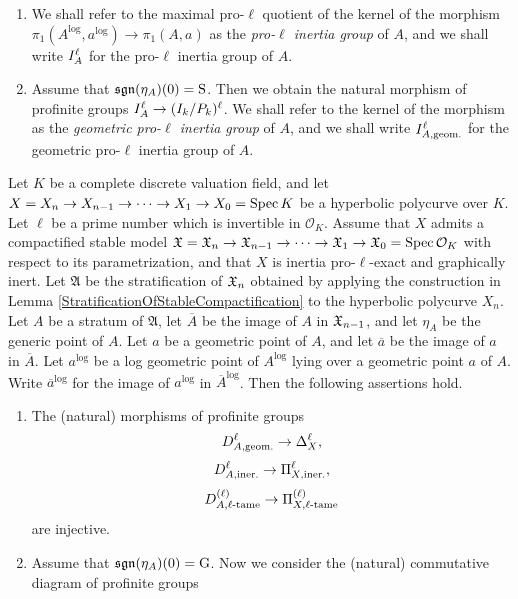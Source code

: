 \begin{defn}
\begin{enumerate}
    \item We shall refer to the maximal pro-$\ell$ quotient of the kernel of the morphism $\pi_1(A^\log, a^\log) \to \pi_1(A, a)$ as the \emph{pro-$\ell$ inertia group} of $A$, and we shall write $I^{\ell}_{A}$ for the pro-$\ell$ inertia group of $A$.
    \item Assume that $\mathfrak{sgn}(\eta_A)(0) = \mathrm{S}$. Then we obtain the natural morphism of profinite groups $I^{\ell}_{A} \to (I_k/P_k)^\ell$. We shall refer to the kernel of the morphism as the \emph{geometric pro-$\ell$ inertia group} of $A$, and we shall write $I^{\ell}_{A, \text{geom.}}$ for the geometric pro-$\ell$ inertia group of $A$.
  \end{enumerate}
\end{defn}

\begin{prop}\label{DecompositionGroupsAndInertiaGroupsAssociatedToStrataCertainExactSequences}
  Let $K$ be a complete discrete valuation field, and let $X = X_n \to X_{n - 1} \to \cdots \to X_1 \to X_0 = \mathrm{Spec} \, K$ be a hyperbolic polycurve over $K$. Let $\ell$ be a prime number which is invertible in $\mathcal{O}_K$. Assume that $X$ admits a compactified stable model $\mathfrak{X} = \mathfrak{X}_n \to \mathfrak{X}_{n - 1} \to \cdots \to \mathfrak{X}_1 \to \mathfrak{X}_0 = \mathrm{Spec} \, \mathcal{O}_K$ with respect to its parametrization, and that $X$ is inertia pro-$\ell$-exact and graphically inert. Let $\mathfrak{A}$ be the stratification of $\mathfrak{X}_n$ obtained by applying the construction in Lemma \ref{StratificationOfStableCompactification} to the hyperbolic polycurve $X_n$. Let $A$ be a stratum of $\mathfrak{A}$, let $\overline{A}$ be the image of $A$ in $\mathfrak{X}_{n - 1}$, and let $\eta_A$ be the generic point of $A$. Let $a$ be a geometric point of $A$, and let $\overline{a}$ be the image of $a$ in $\overline{A}$. Let $a^\log$ be a log geometric point of $A^\log$ lying over a geometric point $a$ of $A$. Write $\overline{a}^\log$ for the image of $a^\log$ in $\overline{A}^\log$. Then the following assertions hold.
  \begin{enumerate}
    \item The (natural) morphisms of profinite groups
    \[D^{\ell}_{A, \text{geom.}} \to \Delta_{X}^\ell,\]
    \[D^{\ell}_{A, \text{iner.}} \to \Pi^{\ell}_{X, \text{iner.}},\]
    \[D^{(\ell)}_{A, \ell\text{-tame}} \to \Pi^{(\ell)}_{X, \ell\text{-tame}}\]
    are injective.
    \item Assume that $\mathfrak{sgn}(\eta_A)(0) = \mathrm{G}$. Now we consider the (natural) commutative diagram of profinite groups

\end{enumerate}
\end{prop}
